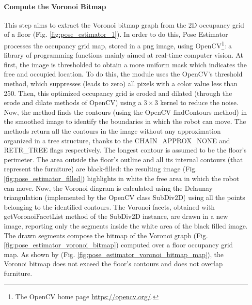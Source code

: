 \paragraph*{Compute the Voronoi Bitmap} This step aims to extract the Voronoi bitmap graph from the 2D occupancy grid of a floor (Fig. \ref{fig:pose_estimator_1}). In order to do this, Pose Estimator processes the occupancy grid map, stored in a \textsf{png} image, using OpenCV\footnote{The OpenCV home page \url{https://opencv.org/}.}: a library of programming functions mainly aimed at real-time computer vision. At first, the image is thresholded to obtain a more uniform mask which indicates the free and occupied location. To do this, the module uses the OpenCV's \textsf{threshold} method, which suppresses (leads to zero) all pixels with a color value less than 250. Then, this optimized occupancy grid is eroded and dilated (through the \textsf{erode} and \textsf{dilate} methods of OpenCV) using a $3 \times 3$ kernel to reduce the noise. Now, the method finds the contours (using the OpenCV \textsf{findContours} method) in the smoothed image to identify the boundaries in which the robot can move. The methods return all the contours in the image without any approximation organized in a tree structure, thanks to the \textsf{CHAIN\_APPROX\_NONE} and \textsf{RETR\_TREE} flags respectively. The longest contour is assumed to be the floor's perimeter. The area outside the floor's outline and all its internal contours (that represent the furniture) are black-filled: the resulting image (Fig. \ref{fig:pose_estimator_filled}) highlights in white the free area in which the robot can move. Now, the Voronoi diagram is calculated using the Delaunay triangulation \cite{delaunayproof} (implemented by the OpenCV class \textsf{SubDiv2D}) using all the points belonging to the identified contours.  The Voronoi facets, obtained with \textsf{getVoronoiFacetList} method of the \textsf{SubDiv2D} instance, are drawn in a new image, reporting only the segments inside the white area of the black filled image. The drawn segments compose the bitmap of the Voronoi graph (Fig. \ref{fig:pose_estimator_voronoi_bitmap}) computed over a floor occupancy grid map. As shown by (Fig. \ref{fig:pose_estimator_voronoi_bitmap_map}), the Voronoi bitmap does not exceed the floor's contours and does not overlap furniture. 

